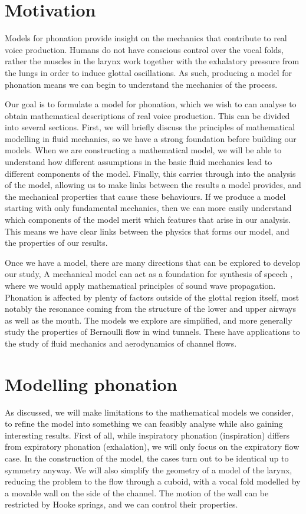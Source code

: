 \documentclass{report}
\begin{document}
\section{Motivation}

Models for phonation provide insight on the mechanics that contribute to real voice production.
Humans do not have conscious control over the vocal folds,
rather the muscles in the larynx work together with the exhalatory pressure from the lungs in order to induce glottal oscillations.
As such, producing a model for phonation means we can begin to understand the mechanics of the process.

Our goal is to formulate a model for phonation,
which we wish to can analyse to obtain mathematical descriptions of real voice production.
This can be divided into several sections.
First, we will briefly discuss the principles of mathematical modelling in fluid mechanics,
so we have a strong foundation before building our models.
When we are constructing a mathematical model,
we will be able to understand how different assumptions in the basic fluid mechanics lead to different components of the model.
Finally, this carries through into the analysis of the model,
allowing us to make links between the results a model provides,
and the mechanical properties that cause these behaviours.
If we produce a model starting with only fundamental mechanics,
then we can more easily understand which components of the model merit which features that arise in our analysis.
This means we have clear links between the physics that forms our model,
and the properties of our results.

Once we have a model,
there are many directions that can be explored to develop our study,
A mechanical model can act as a foundation for synthesis of speech \cite{ishizaka_flanagan_1972},
where we would apply mathematical principles of sound wave propagation.
Phonation is affected by plenty of factors outside of the glottal region itself,
most notably the resonance coming from the structure of the lower and upper airways as well as the mouth.
The models we explore are simplified,
and more generally study the properties of Bernoulli flow in wind tunnels.
These have applications to the study of fluid mechanics and aerodynamics of channel flows.

\section{Modelling phonation}

As discussed, we will make limitations to the mathematical models we consider,
to refine the model into something we can feasibly analyse while also gaining interesting results.
First of all, while inspiratory phonation (inspiration) differs from expiratory phonation (exhalation),
we will only focus on the expiratory flow case.
In the construction of the model, the cases turn out to be identical up to symmetry anyway.
We will also simplify the geometry of a model of the larynx,
reducing the problem to the flow through a cuboid, with a vocal fold modelled by a movable wall on the side of the channel.
The motion of the wall can be restricted by Hooke springs, and we can control their properties.
\end{document}
